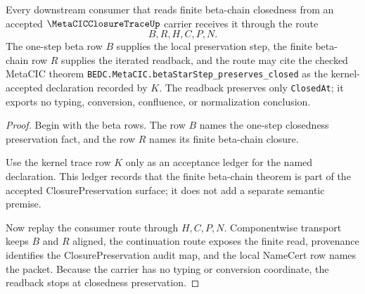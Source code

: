 \begin{theorem}
\label{thm:metacicclosuretrace-beta-star-preservation-readback}
Every downstream consumer that reads finite beta-chain closedness from an accepted $\MetaCICClosureTraceUp$ carrier receives it through the route
$$
B,R,H,C,P,N.
$$
The one-step beta row $B$ supplies the local preservation step, the finite beta-chain row $R$ supplies the iterated readback, and the route may cite the checked MetaCIC theorem \texttt{BEDC.MetaCIC.betaStarStep\_preserves\_closed} as the kernel-accepted declaration recorded by $K$. The readback preserves only \texttt{ClosedAt}; it exports no typing, conversion, confluence, or normalization conclusion.
\end{theorem}
\begin{proof}
Begin with the beta rows. The row $B$ names the one-step closedness preservation fact, and the row $R$ names its finite beta-chain closure.

Use the kernel trace row $K$ only as an acceptance ledger for the named declaration. This ledger records that the finite beta-chain theorem is part of the accepted ClosurePreservation surface; it does not add a separate semantic premise.

Now replay the consumer route through $H,C,P,N$. Componentwise transport keeps $B$ and $R$ aligned, the continuation route exposes the finite read, provenance identifies the ClosurePreservation audit map, and the local NameCert row names the packet. Because the carrier has no typing or conversion coordinate, the readback stops at closedness preservation.
\end{proof}

